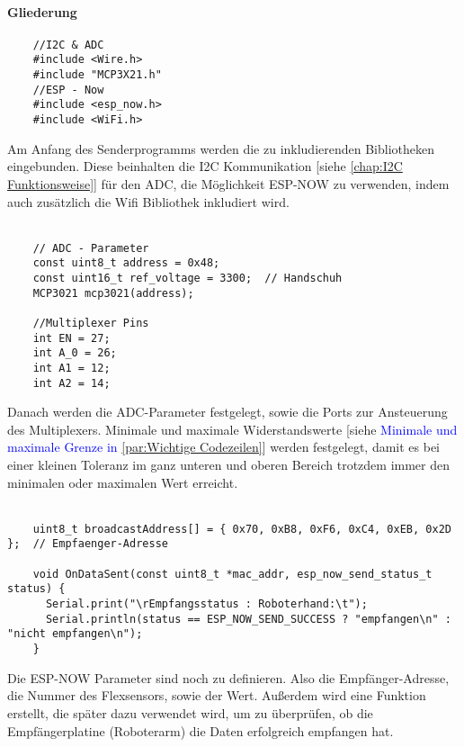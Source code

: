 \documentclass[titlepage,12pt,twoside]{article}
\begin{document}
\paragraph{Gliederung}
\hfill \break
\hfill \break
\footnotesize
\begin{lstlisting}
	//I2C & ADC
	#include <Wire.h>
	#include "MCP3X21.h"
	//ESP - Now
	#include <esp_now.h>
	#include <WiFi.h>	
\end{lstlisting}
\hfill \break
\normalsize
Am Anfang des Senderprogramms werden die zu inkludierenden Bibliotheken eingebunden. Diese beinhalten die I2C Kommunikation [siehe \textcolor{blue}{\autoref{chap:I2C Funktionsweise}}] für 
den ADC, die Möglichkeit ESP-NOW zu verwenden, indem auch zusätzlich die Wifi Bibliothek inkludiert wird. \\
\\
\footnotesize
\begin{lstlisting}
	// ADC - Parameter
	const uint8_t address = 0x48;
	const uint16_t ref_voltage = 3300;  // Handschuh
	MCP3021 mcp3021(address);
	
	//Multiplexer Pins
	int EN = 27;
	int A_0 = 26;
	int A1 = 12;
	int A2 = 14;		
\end{lstlisting}
\hfill \break
\normalsize
Danach werden die ADC-Parameter festgelegt, sowie die Ports zur Ansteuerung des Multiplexers. Minimale und maximale 
Widerstandswerte [siehe \textcolor{blue}{Minimale und maximale Grenze in \autoref{par:Wichtige Codezeilen}}] werden festgelegt, damit es bei einer kleinen Toleranz im ganz unteren und oberen Bereich trotzdem immer den 
minimalen oder maximalen Wert erreicht. \\
\\
\footnotesize
\begin{lstlisting}
	uint8_t broadcastAddress[] = { 0x70, 0xB8, 0xF6, 0xC4, 0xEB, 0x2D };  // Empfaenger-Adresse
	
	void OnDataSent(const uint8_t *mac_addr, esp_now_send_status_t status) {
	  Serial.print("\rEmpfangsstatus : Roboterhand:\t");
	  Serial.println(status == ESP_NOW_SEND_SUCCESS ? "empfangen\n" : "nicht empfangen\n");
	}			
\end{lstlisting}
\hfill \break
\normalsize
Die ESP-NOW Parameter sind noch zu definieren. Also die Empfänger-Adresse, die Nummer des Flexsensors, sowie der Wert. Außerdem 
wird eine Funktion erstellt, die später dazu verwendet wird, um zu überprüfen, ob die Empfängerplatine (Roboterarm) die Daten 
erfolgreich empfangen hat. \\
\\
\end{document}
